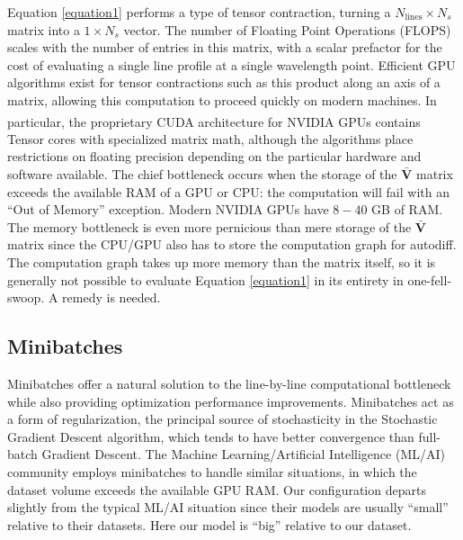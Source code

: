 \documentclass[modern]{aastex631}
\begin{document}
Equation \ref{equation1} performs a type of tensor contraction, turning a $N_{\mathrm{lines}}\times N_{s}$ matrix into a $1\times N_{s}$ vector. The number of Floating Point Operations (FLOPS) scales with the number of entries in this matrix, with a scalar prefactor for the cost of evaluating a single line profile at a single wavelength point. Efficient GPU algorithms exist for tensor contractions such as this product along an axis of a matrix, allowing this computation to proceed quickly on modern machines. In particular, the proprietary CUDA architecture for NVIDIA\textsuperscript{\tiny\textregistered} GPUs contains Tensor cores with specialized matrix math, although the algorithms place restrictions on floating precision depending on the particular hardware and software available. The chief bottleneck occurs when the storage of the $\bm{\bar{V}}$ matrix exceeds the available RAM of a GPU or CPU: the computation will fail with an ``Out of Memory'' exception. Modern NVIDIA GPUs have $8-40$ GB of RAM. The memory bottleneck is even more pernicious than mere storage of the $\bm{\bar{V}}$ matrix since the CPU/GPU also has to store the computation graph for autodiff. The computation graph takes up more memory than the matrix itself, so it is generally not possible to evaluate Equation \ref{equation1} in its entirety in one-fell-swoop. A remedy is needed.

\subsection{Minibatches}

Minibatches offer a natural solution to the line-by-line computational bottleneck while also providing optimization performance improvements. Minibatches act as a form of regularization, the principal source of stochasticity in the Stochastic Gradient Descent algorithm, which tends to have better convergence than full-batch Gradient Descent. The Machine Learning/Artificial Intelligence (ML/AI) community employs minibatches to handle similar situations, in which the dataset volume exceeds the available GPU RAM. Our configuration departs slightly from the typical ML/AI situation since their models are usually ``small'' relative to their datasets. Here our model is ``big'' relative to our dataset.
\end{document}

